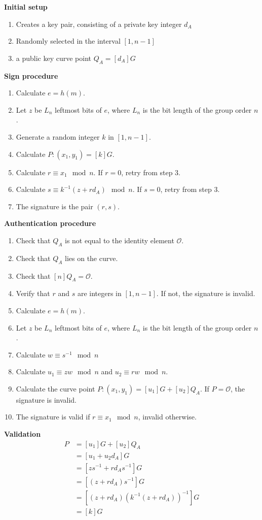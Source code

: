 \documentclass[12pt]{article}
\theoremstyle{definition}
\begin{document}
\textbf{Initial setup}
\begin{enumerate}
    \item Creates a key pair, consisting of a private key integer $d_{A}$
    \item Randomly selected in the interval $[1,n-1]$
    \item a public key curve point $Q_A=[d_A]G$
\end{enumerate}

\textbf{Sign procedure}
\begin{enumerate}
\item Calculate $e=h(m)$.
\item Let $z$ be $L_n$ leftmost bits of $e$, where $L_n$ is the  bit length of the group order $n$.
\item Generate a random integer $k$ in $[1,n-1]$.
\item Calculate $P:(x_1,y_1)=[k]G$.
\item Calculate $r\equiv x_1\mod n$. If $r=0$, retry from step 3.
\item Calculate $s\equiv k^{-1}(z+rd_A)\mod n$. If $s=0$, retry from step 3.
\item The signature is the pair $(r,s)$.
\end{enumerate}

\textbf{Authentication procedure}
\begin{enumerate}
\item Check that $Q_{A}$ is not equal to the identity element $\mathcal{O}$.
\item Check that $Q_{A}$ lies on the curve.
\item Check that $[n]Q_{A}=\mathcal{O}$.
\item Verify that $r$ and $s$ are integers in $[1,n-1]$. If not, the signature is invalid.
\item Calculate $e=h(m)$.
\item Let $z$ be $L_n$ leftmost bits of $e$, where $L_n$ is the  bit length of the group order $n$.
\item Calculate $w\equiv s^{-1}\mod n$
\item Calculate $u_1\equiv zw\mod n$ and $u_2\equiv rw\mod n$.
\item Calculate the curve point $P:(x_1,y_1)=[u_1]G+[u_2]Q_A$. If $P=\mathcal{O}$, the signature is invalid.
\item The signature is valid if $r\equiv x_1\mod n$, invalid otherwise.
\end{enumerate}

\textbf{Validation}
\begin{align*}
P&=[u_1]G+[u_2]Q_A\\
&=[u_1+u_2d_A]G\\
&=[zs^{-1}+rd_As^{-1}]G\\
&=[(z+rd_A)s^{-1}]G\\
&=[(z+rd_A)(k^{-1}(z+rd_A))^{-1}]G\\
&=[k]G
\end{align*}
\end{document}
